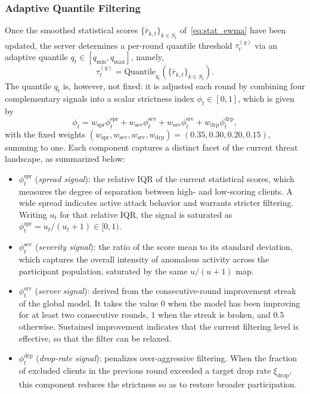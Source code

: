 \documentclass[journal]{IEEEtran}
\begin{document}
\subsubsection{Adaptive Quantile Filtering}
Once the smoothed statistical scores $\{\bar r_{k,t}\}_{k\in S_t}$ of~\eqref{eq:stat_ewma} have been updated, the server determines a per-round quantile threshold $\tau_t^{(q)}$ via an adaptive quantile $q_t \in [q_{\min}, q_{\max}]$, namely,
\begin{equation}
\tau_t^{(q)} = \text{Quantile}_{q_t}\!\left(\{\bar r_{k,t}\}_{k \in S_t}\right).
\label{eq:filt_threshold}
\end{equation}
The quantile $q_t$ is, however, not fixed: it is adjusted each round by combining four complementary signals into a scalar strictness index $\phi_t \in [0,1]$, which is given by
\begin{equation}
\phi_t = w_{\mathrm{spr}} \phi_t^{\mathrm{spr}} + w_{\mathrm{sev}} \phi_t^{\mathrm{sev}} + w_{\mathrm{srv}} \phi_t^{\mathrm{srv}} + w_{\mathrm{drp}} \phi_t^{\mathrm{drp}},
\label{eq:strictness}
\end{equation}
with the fixed weights $(w_{\mathrm{spr}}, w_{\mathrm{sev}}, w_{\mathrm{srv}}, w_{\mathrm{drp}}) = (0.35, 0.30, 0.20, 0.15)$, summing to one. Each component captures a distinct facet of the current threat landscape, as summarized below:
\begin{itemize}
    \item $\phi_t^{\mathrm{spr}}$ (\emph{spread signal}): the relative IQR of the current statistical scores, which measures the degree of separation between high- and low-scoring clients. A wide spread indicates active attack behavior and warrants stricter filtering. Writing $u_t$ for that relative IQR, the signal is saturated as $\phi_t^{\mathrm{spr}} = u_t/(u_t+1) \in [0,1)$.
    \item $\phi_t^{\mathrm{sev}}$ (\emph{severity signal}): the ratio of the score mean to its standard deviation, which captures the overall intensity of anomalous activity across the participant population, saturated by the same $u/(u+1)$ map.
    \item $\phi_t^{\mathrm{srv}}$ (\emph{server signal}): derived from the consecutive-round improvement streak of the global model. It takes the value $0$ when the model has been improving for at least two consecutive rounds, $1$ when the streak is broken, and $0.5$ otherwise. Sustained improvement indicates that the current filtering level is effective, so that the filter can be relaxed.
    \item $\phi_t^{\mathrm{drp}}$ (\emph{drop-rate signal}): penalizes over-aggressive filtering. When the fraction of excluded clients in the previous round exceeded a target drop rate $\xi_{\mathrm{drop}}$, this component reduces the strictness so as to restore broader participation.
\end{itemize}
\end{document}
